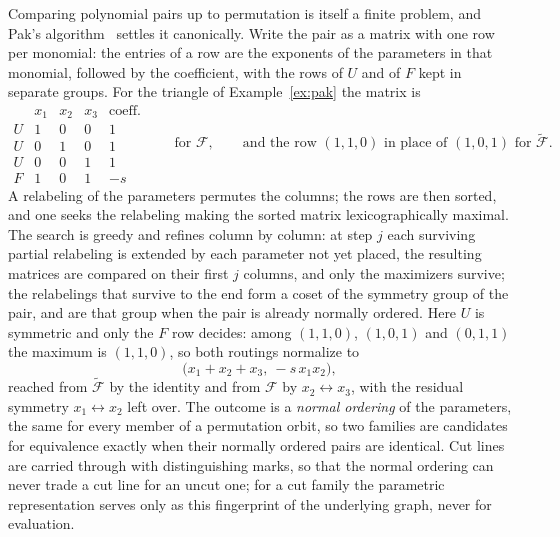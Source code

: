 \documentclass[11pt]{article}
\begin{document}
Comparing polynomial pairs up to permutation is itself a finite
problem, and Pak's algorithm~\cite{pak} settles it canonically.  Write
the pair
as a matrix with one row per monomial: the entries of a row are the
exponents of the parameters in that monomial, followed by the
coefficient, with the rows of $U$ and of $F$ kept in separate groups.
For the triangle of Example~\ref{ex:pak} the matrix is
\begin{equation}
  \begin{array}{c|ccc|c}
     & x_1 & x_2 & x_3 & \text{coeff.}\\\hline
   U & 1 & 0 & 0 & 1\\
   U & 0 & 1 & 0 & 1\\
   U & 0 & 0 & 1 & 1\\\hline
   F & 1 & 0 & 1 & -s
  \end{array}
  \qquad\text{for } \mathcal{F},
  \qquad
  \text{and the row } (1,1,0) \text{ in place of } (1,0,1)
  \text{ for } \widetilde{\mathcal{F}} .
\end{equation}
A relabeling of the parameters permutes the columns; the rows are then
sorted, and one seeks the relabeling making the sorted matrix
lexicographically maximal.  The search is greedy and refines column by
column: at step $j$ each surviving partial relabeling is extended by
each parameter not yet placed, the resulting matrices are compared on
their first $j$ columns, and only the maximizers survive; the
relabelings that survive to the end form a coset of the symmetry group
of the pair, and are that group when the pair is already normally
ordered.  Here $U$ is symmetric and only the $F$ row decides: among
$(1,1,0)$, $(1,0,1)$ and $(0,1,1)$ the maximum is $(1,1,0)$, so both
routings normalize to
\begin{equation}
  \big(x_1+x_2+x_3,\ -s\,x_1x_2\big),
\end{equation}
reached from $\widetilde{\mathcal{F}}$ by the identity and from
$\mathcal{F}$ by $x_2 \leftrightarrow x_3$, with the residual
symmetry $x_1 \leftrightarrow x_2$ left over.  The outcome is a
\emph{normal ordering} of the parameters, the same for every member
of a permutation orbit, so two families are candidates for
equivalence exactly when their normally ordered pairs are identical.
Cut lines are carried through with distinguishing marks, so that the
normal ordering can never trade a cut line for an uncut one; for a
cut family the parametric representation serves only as this
fingerprint of the underlying graph, never for evaluation.
\end{document}
